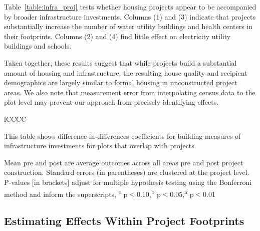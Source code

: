 \documentclass[12pt]{article}
\newcommand{\regtextfirst}{
Mean pre and post are average outcomes across all areas pre and post project construction.  Standard errors (in parentheses) are clustered at the project level.  P-values [in brackets] adjust for multiple hypothesis testing using the Bonferroni method and inform the superscripts, \textsuperscript{c} p$<$0.10,\textsuperscript{b} p$<$0.05,\textsuperscript{a} p$<$0.01 \,\,
}
\newcommand{\rv}{}
\begin{document}
\rv{Table~\ref{table:infra_proj} tests whether housing projects appear to be accompanied by broader infrastructure investments.  Columns (1) and (3) indicate that projects substantially increase the number of water utility buildings and health centers in their footprints.  Columns (2) and (4) find little effect on electricity utility buildings and schools.}

\rv{Taken together, these results suggest that while projects build a substantial amount of housing and infrastructure, the resulting house quality and recipient demographics are largely similar to formal housing in unconstructed project areas.  We also note that measurement error from interpolating census data to the plot-level may prevent our approach from precisely identifying effects.}

\begin{table}[h!]
\small
\centering
\caption{Infrastructure Investments}\label{table:infra_proj}
\vspace{-2mm}
\begin{threeparttable}
\begin{tabular}{lCCCC}
\toprule

\bottomrule
\end{tabular}
\begin{tablenotes}
\item \footnotesize This table shows difference-in-differences coefficients for building measures of infrastructure investments for plots that overlap with projects.
 \regtextfirst
\end{tablenotes}
\end{threeparttable}
\end{table}


\subsection{Estimating Effects Within Project Footprints}\label{section:directeffects}
\end{document}
